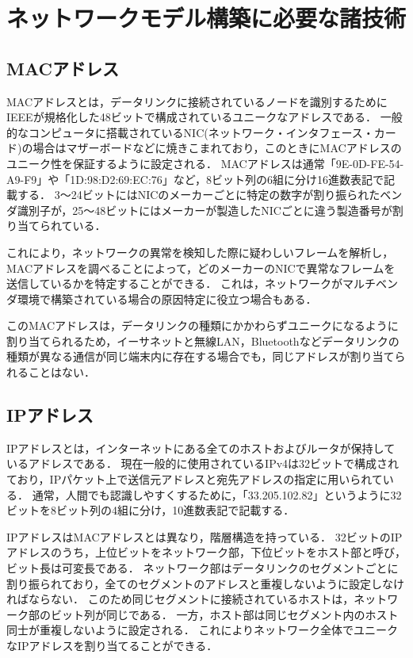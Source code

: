 \section{ネットワークモデル構築に必要な諸技術}

\subsection{MACアドレス}

MACアドレスとは，データリンクに接続されているノードを識別するためにIEEEが規格化した48ビットで構成されているユニークなアドレスである\cite{masteringtcpip}．
一般的なコンピュータに搭載されているNIC(ネットワーク・インタフェース・カード)の場合はマザーボードなどに焼きこまれており，このときにMACアドレスのユニーク性を保証するように設定される．
MACアドレスは通常「9E-0D-FE-54-A9-F9」や「1D:98:D2:69:EC:76」など，8ビット列の6組に分け16進数表記で記載する．
3～24ビットにはNICのメーカーごとに特定の数字が割り振られたベンダ識別子が，25～48ビットにはメーカーが製造したNICごとに違う製造番号が割り当てられている．

これにより，ネットワークの異常を検知した際に疑わしいフレームを解析し，MACアドレスを調べることによって，どのメーカーのNICで異常なフレームを送信しているかを特定することができる．
これは，ネットワークがマルチベンダ環境で構築されている場合の原因特定に役立つ場合もある．

このMACアドレスは，データリンクの種類にかかわらずユニークになるように割り当てられるため，イーサネットと無線LAN，Bluetoothなどデータリンクの種類が異なる通信が同じ端末内に存在する場合でも，同じアドレスが割り当てられることはない．

\subsection{IPアドレス}

IPアドレスとは，インターネットにある全てのホストおよびルータが保持しているアドレスである\cite{tanenbaum}．
現在一般的に使用されているIPv4は32ビットで構成されており，IPパケット上で送信元アドレスと宛先アドレスの指定に用いられている．
通常，人間でも認識しやすくするために，「33.205.102.82」というように32ビットを8ビット列の4組に分け，10進数表記で記載する．

IPアドレスはMACアドレスとは異なり，階層構造を持っている\cite{masteringtcpip}．
32ビットのIPアドレスのうち，上位ビットをネットワーク部，下位ビットをホスト部と呼び，ビット長は可変長である．
ネットワーク部はデータリンクのセグメントごとに割り振られており，全てのセグメントのアドレスと重複しないように設定しなければならない．
このため同じセグメントに接続されているホストは，ネットワーク部のビット列が同じである．
一方，ホスト部は同じセグメント内のホスト同士が重複しないように設定される．
これによりネットワーク全体でユニークなIPアドレスを割り当てることができる．

